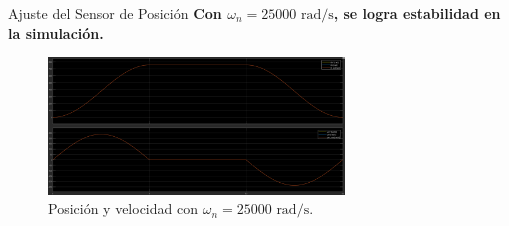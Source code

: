 \documentclass[12pt]{beamer}
\begin{document}
\begin{frame}{Ajuste del Sensor de Posición}
    \textbf{Con \(\omega_n = 25000 \text{ rad/s}\), se logra estabilidad en la simulación.}
    \begin{figure}
        \centering
        \includegraphics[width=0.7\textwidth]{Imagenes/5_posNI_25000_pw.png}
        \caption{Posición y velocidad con \(\omega_n = 25000 \text{ rad/s}\).}
    \end{figure}
\end{frame}
\end{document}
